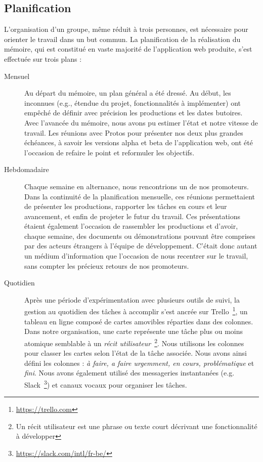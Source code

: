 \documentclass{EPL-master-thesis-covers-FR}
\begin{document}
			\subsection*{Planification}
				\label{sec:planification}

				L'organisation d'un groupe, même réduit à trois personnes, est nécessaire pour orienter le travail dans un but commun. La planification de la réalisation du mémoire, qui est constitué en vaste majorité de l'application web produite, s'est effectuée sur trois plans :

				\begin{description}
					\item[Mensuel] Au départ du mémoire, un plan général a été dressé. Au début, les inconnues (e.g., étendue du projet, fonctionnalités à implémenter) ont empêché de définir avec précision les productions et les dates butoires. Avec l'avancée du mémoire, nous avons pu estimer l'état et notre vitesse de travail. Les réunions avec Protos pour présenter nos deux plus grandes échéances, à savoir les versions alpha et beta de l'application web, ont été l'occasion de refaire le point et reformuler les objectifs.

					\item[Hebdomadaire] Chaque semaine en alternance, nous rencontrions un de nos promoteurs. Dans la continuité de la planification mensuelle, ces réunions permettaient de présenter les productions, rapporter les tâches en cours et leur avancement, et enfin de projeter le futur du travail. Ces présentations étaient également l'occasion de rassembler les productions et d'avoir, chaque semaine, des documents ou démonstrations pouvant être comprises par des acteurs étrangers à l'équipe de développement. C'était donc autant un médium d'information que l'occasion de nous recentrer sur le travail, sans compter les précieux retours de nos promoteurs.

					\item[Quotidien] Après une période d'expérimentation avec plusieurs outils de suivi, la gestion au quotidien des tâches à accomplir s'est ancrée sur Trello~\footnote{\url{https://trello.com}}, un tableau en ligne composé de cartes amovibles réparties dans des colonnes. Dans notre organisation, une carte représente une tâche plus ou moins atomique semblable à un \emph{récit utilisateur}~\footnote{Un récit utilisateur est une phrase ou texte court décrivant une fonctionnalité à développer}. Nous utilisons les colonnes pour classer les cartes selon l'état de la tâche associée. Nous avons ainsi défini les colonnes : \emph{à faire, a faire urgemment, en cours, problématique} et \emph{fini}. Nous avons également utilisé des messageries instantanées (e.g. Slack~\footnote{\url{https://slack.com/intl/fr-be/}}) et canaux vocaux pour organiser les tâches.
				\end{description}
\end{document}
